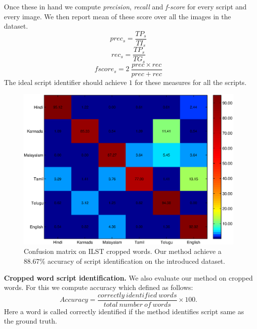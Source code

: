 Once these in hand we compute \textit{precision}, \textit{recall} and \textit{f-score}
for every script and every image. We then report mean of
these score over all the images in the dataset.  
\begin{equation}
prec_s = \frac{TP_s}{TI_s}
\end{equation}
\begin{equation}
rec_s = \frac{TP_s}{TG_s}
\end{equation}
\begin{equation}
fscore_s= 2~\frac{prec \times rec}{prec+rec}
\end{equation}
The ideal script identifier should achieve
$1$ for these measures for all the scripts.
\begin{figure}[t]
\centering
  \includegraphics[scale=0.5]{figures/confusion_1.eps}
  \caption{Confusion matrix on ILST cropped words. Our method achieve a 88.67\% accuracy of script identification on the introduced dataset.}
  \label{fig:cm}
\end{figure}

\noindent \textbf{Cropped word script identification.}
We also evaluate our method on cropped words. For this we compute
accuracy which defined as follows:
\begin{equation}
Accuracy = \frac{{correctly~identified~words}}{{total~number~of~words}} \times 100.
\end{equation}
Here a word is called correctly identified if the method identifies script same as the ground truth.

